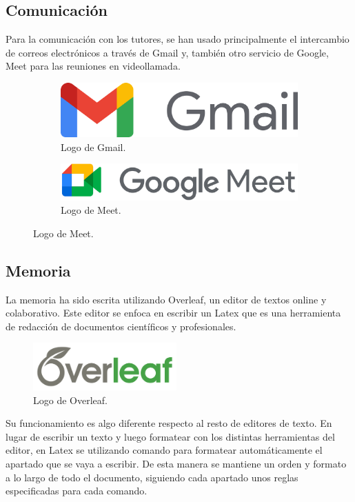 \subsection{Comunicación}
Para la comunicación con los tutores, se han usado principalmente el intercambio de correos electrónicos a través de Gmail y, también otro servicio de Google, Meet para las reuniones en videollamada.
\begin{figure} [h]
     \centering
     \begin{subfigure}[b]{.35\textwidth}
         \centering
         \includegraphics[width=\textwidth]{imagenes/capitulo3/GmailLogo.png}
         \caption{Logo de Gmail.}
         \label{fig:gmail_logo}
     \end{subfigure}
     \hfill
     \begin{subfigure}[b]{.55\textwidth}
         \centering
         \includegraphics[width=\textwidth]{imagenes/capitulo3/MeetLogo.png}
         \caption{Logo de Meet.}
         \label{fig:meet_logo}
     \end{subfigure}
\end{figure}

\subsection{Memoria}
La memoria ha sido escrita utilizando Overleaf, un editor de textos online y colaborativo. Este editor se enfoca en escribir un Latex que es una herramienta de redacción de documentos científicos y profesionales.
\begin{figure}[h]
        \centering
        \includegraphics[width=5.5cm]{imagenes/capitulo3/Overleaf_logo.png}
        \caption{Logo de Overleaf.}
        \label{fig:overleaf_logo}
    \end{figure}
Su funcionamiento es algo diferente respecto al resto de editores de texto. En lugar de escribir un texto y luego formatear con los distintas herramientas del editor, en Latex se utilizando comando para formatear automáticamente el apartado que se vaya a escribir. De esta manera se mantiene un orden y formato a lo largo de todo el documento, siguiendo cada apartado unos reglas especificadas para cada comando.

